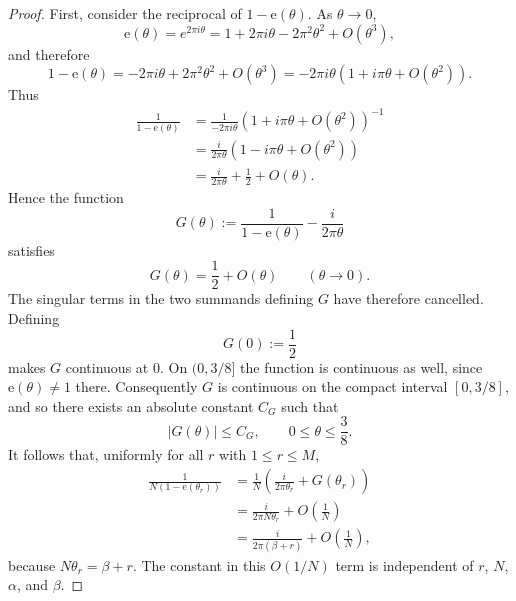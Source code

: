 \documentclass[10pt,a4paper]{amsart}
\newcommand{\et}[1]{\mathrm e\!\left(#1\right)}
\begin{document}
\begin{proof}
First, consider the reciprocal of $1-\mathrm{e}\!\left(\theta\right)$. As $%
\theta\to0$, 
\begin{equation*}
\mathrm{e}\!\left(\theta\right)=e^{2\pi i\theta} =1+2\pi
i\theta-2\pi^2\theta^2+O(\theta^3),
\end{equation*}
and therefore 
\begin{equation*}
1-\mathrm{e}\!\left(\theta\right) =-2\pi i\theta+2\pi^2\theta^2+O(\theta^3)
=-2\pi i\theta\left(1+i\pi\theta+O(\theta^2)\right).
\end{equation*}
Thus 
\begin{equation*}
\begin{aligned} \frac1{1-\et{\theta}} &=\frac1{-2\pi i\theta}
\left(1+i\pi\theta+O(\theta^2)\right)^{-1} \\ &=\frac{i}{2\pi\theta}
\left(1-i\pi\theta+O(\theta^2)\right) \\
&=\frac{i}{2\pi\theta}+\frac12+O(\theta). \end{aligned}
\end{equation*}
Hence the function 
\begin{equation*}
G(\theta):=\frac1{1-\mathrm{e}\!\left(\theta\right)}-\frac{i}{2\pi\theta}
\end{equation*}
satisfies 
\begin{equation*}
G(\theta)=\frac12+O(\theta) \qquad (\theta\to0).
\end{equation*}
The singular terms in the two summands defining $G$ have therefore
cancelled. Defining 
\begin{equation*}
G(0):=\frac12
\end{equation*}
makes $G$ continuous at $0$. On $(0,3/8]$ the function is continuous as
well, since $\mathrm{e}\!\left(\theta\right)\neq1$ there. Consequently $G$
is continuous on the compact interval $[0,3/8]$, and so there exists an
absolute constant $C_G$ such that 
\begin{equation*}
|G(\theta)|\le C_G, \qquad 0\le \theta\le \frac38.
\end{equation*}
It follows that, uniformly for all $r$ with $1\le r\le M$, 
\begin{equation*}
\begin{aligned} \frac1{N(1-\et{\theta_r})}
&=\frac1N\left(\frac{i}{2\pi\theta_r}+G(\theta_r)\right) \\ &=\frac{i}{2\pi
N\theta_r}+O\!\left(\frac1N\right) \\
&=\frac{i}{2\pi(\beta+r)}+O\!\left(\frac1N\right), \end{aligned}
\end{equation*}
because $N\theta_r=\beta+r$. The constant in this $O(1/N)$ term is
independent of $r$, $N$, $\alpha$, and $\beta$.


\end{proof}
\end{document}
